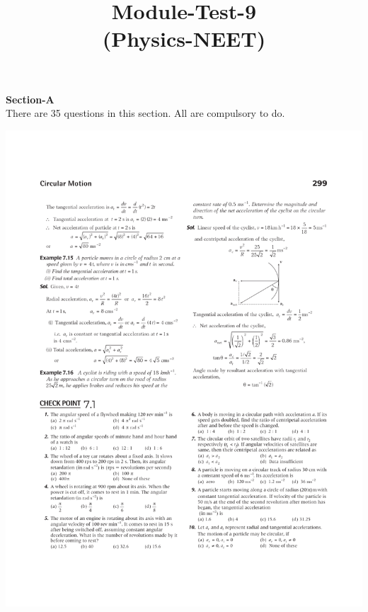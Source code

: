 \documentclass{article}
\title{Module-Test-9\\(Physics-NEET)}
\begin{document}
\maketitle
\noindent

\begin{center}
\textbf{Section-A}\\[4 mm]
There are 35 questions in this section. All are compulsory to do.\\[4 mm]
\end{center}

\includegraphics[trim={0.25cm 0 0 0},clip, width=170 mm]{1-10}
\linebreak
\end{document}
